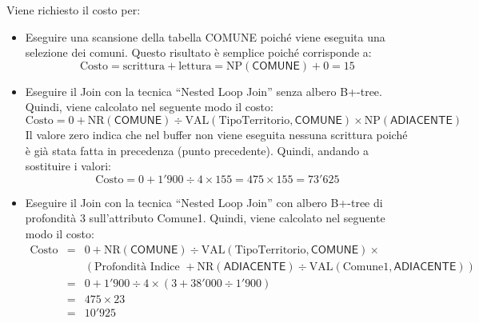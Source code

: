 \documentclass[a4paper]{article}
\newcommand{\dquotes}[1]{``#1''}
\begin{document}
	\noindent
	Viene richiesto il costo per:
	\begin{itemize}
		\item Eseguire una scansione della tabella \textsf{COMUNE} poiché viene eseguita una selezione dei comuni. Questo risultato è semplice poiché corrisponde a:
		\begin{equation*}
			\text{Costo} = \text{scrittura} + \text{lettura} = \mathrm{NP}\left(\textsf{COMUNE}\right) + 0 = 15
		\end{equation*}
		
		\item Eseguire il Join con la tecnica \dquotes{Nested Loop Join} senza albero B+-tree. Quindi, viene calcolato nel seguente modo il costo:
		\begin{equation*}
			\text{Costo} = 0 + \mathrm{NR}\left(\textsf{COMUNE}\right) \div \mathrm{VAL}\left(\text{TipoTerritorio}, \textsf{COMUNE}\right) \times \mathrm{NP}\left(\textsf{ADIACENTE}\right)
		\end{equation*}
		Il valore zero indica che nel buffer non viene eseguita nessuna scrittura poiché è già stata fatta in precedenza (punto precedente). Quindi, andando a sostituire i valori:
		\begin{equation*}
			\text{Costo} = 0 + 1'900 \div 4 \times 155 = 475 \times 155 = 73'625
		\end{equation*}
		
		\item Eseguire il Join con la tecnica \dquotes{Nested Loop Join} con albero B+-tree di profondità 3 sull'attributo Comune1. Quindi, viene calcolato nel seguente modo il costo:
		\begin{equation*}
			\begin{array}{lll}
				\text{Costo} &=& 0 + \mathrm{NR}\left(\textsf{COMUNE}\right) \div \mathrm{VAL}\left(\text{TipoTerritorio}, \textsf{COMUNE}\right) \times \\
				&& \left(\text{Profondità Indice } + \mathrm{NR}\left(\textsf{ADIACENTE}\right) \div \mathrm{VAL}\left(\text{Comune1}, \textsf{ADIACENTE}\right)\right) \\
				&=& 0 + 1'900 \div 4 \times \left(3 + 38'000 \div 1'900\right) \\
				&=& 475 \times 23 \\
				&=& 10'925
			\end{array}
		\end{equation*}
	\end{itemize}
	
	\newpage
	
\end{document}
